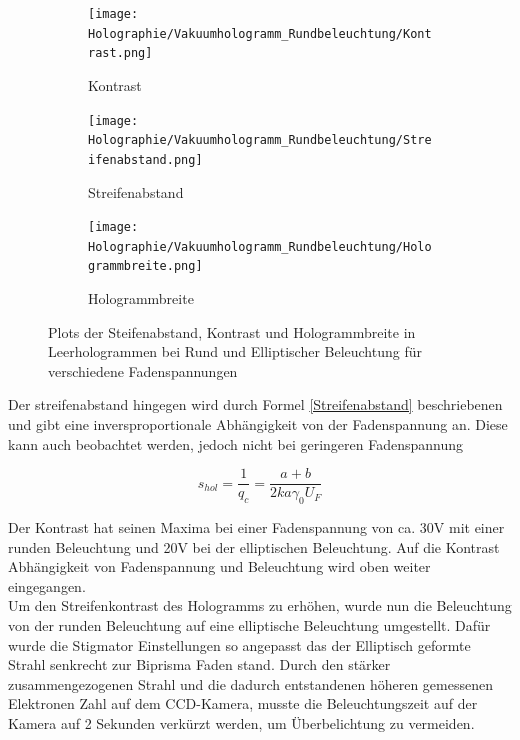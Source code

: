 \begin{figure}
     \centering
     \begin{subfigure}[b]{0.3\textwidth}
         \centering
         \texttt{[image: Holographie/Vakuumhologramm\_Rundbeleuchtung/Kontrast.png]}
         \caption{Kontrast}
         \label{LeerHolKontrast}
     \end{subfigure}
     \hfill
     \begin{subfigure}[b]{0.3\textwidth}
         \centering
         \texttt{[image: Holographie/Vakuumhologramm\_Rundbeleuchtung/Streifenabstand.png]}
         \caption{Streifenabstand}
         \label{LeerHolStreifenabstand}
     \end{subfigure}
     \hfill
     \begin{subfigure}[b]{0.3\textwidth}
         \centering
         \texttt{[image: Holographie/Vakuumhologramm\_Rundbeleuchtung/Hologrammbreite.png]}
         \caption{Hologrammbreite}
         \label{StreifenabstandBreite}
     \end{subfigure}
        \caption{Plots der Steifenabstand, Kontrast und Hologrammbreite in Leerhologrammen bei Rund und Elliptischer Beleuchtung für verschiedene Fadenspannungen}
        \label{VakHolGraph}
\end{figure}

Der streifenabstand hingegen wird durch Formel \cref{Streifenabstand} beschriebenen und gibt eine inversproportionale Abhängigkeit von der Fadenspannung an. Diese kann auch beobachtet werden, jedoch nicht bei geringeren Fadenspannung

\begin{equation}
\label{Streifenabstand}
    s_{hol} = \frac{1}{q_c} = \frac{a+b}{2 k a \gamma_0 U_F}
\end{equation}

Der Kontrast hat seinen Maxima bei einer Fadenspannung von ca. 30V mit einer runden Beleuchtung und 20V bei der elliptischen Beleuchtung. Auf die Kontrast Abhängigkeit von Fadenspannung und Beleuchtung wird oben weiter eingegangen.\\
Um den Streifenkontrast des Hologramms zu erhöhen, wurde nun die Beleuchtung von der runden Beleuchtung auf eine elliptische Beleuchtung umgestellt. Dafür wurde die Stigmator Einstellungen so angepasst das der Elliptisch geformte Strahl senkrecht zur Biprisma Faden stand. Durch den stärker zusammengezogenen Strahl und die dadurch entstandenen höheren gemessenen Elektronen Zahl auf dem CCD-Kamera, musste die Beleuchtungszeit auf der Kamera auf 2 Sekunden verkürzt werden, um Überbelichtung zu vermeiden.

